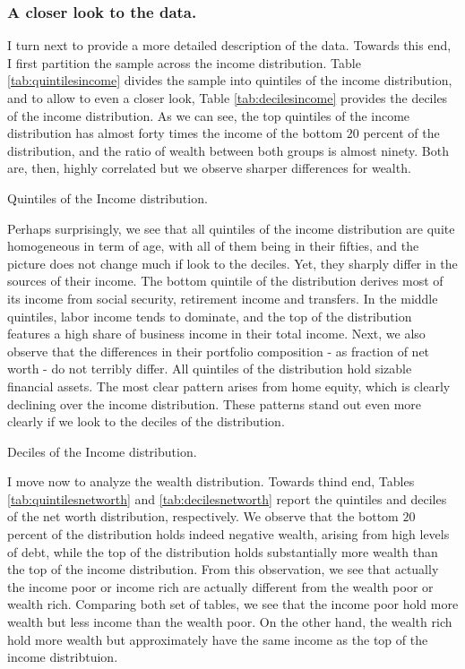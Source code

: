 \documentclass[11pt, a4paper, leqno]{article}
\begin{document}
\subsubsection*{A closer look to the data.}

I turn next to provide a more detailed description of the data. Towards this end, I first partition the sample across the income distribution. Table \ref*{tab:quintilesincome} divides the sample into quintiles of the income distribution, and to allow to even a closer look, Table \ref*{tab:decilesincome} provides the deciles of the income distribution. As we can see, the top quintiles of the income distribution has almost forty times the income of the bottom $20$ percent of the distribution, and the ratio of wealth between both groups is almost ninety. Both are, then, highly correlated but we observe sharper differences for wealth.

\begin{table}[h]
    \caption{Quintiles of the Income distribution.}
    \resizebox{\textwidth}{!}{}
    \label{tab:quintilesincome}
\end{table}

Perhaps surprisingly, we see that all quintiles of the income distribution are quite homogeneous in term of age, with all of them being in their fifties, and the picture does not change much if look to the deciles. Yet, they sharply differ in the sources of their income. The bottom quintile of the distribution derives most of its income from social security, retirement income and transfers. In the middle quintiles, labor income tends to dominate, and the top of the distribution features a high share of business income in their total income. Next, we also observe that the differences in their portfolio composition - as fraction of net worth - do not terribly differ. All quintiles of the distribution hold sizable financial assets. The most clear pattern arises from home equity, which is clearly declining over the income distribution. These patterns stand out even more clearly if we look to the deciles of the distribution. 

\begin{table}[h]
    \caption{Deciles of the Income distribution.}
    \resizebox{\textwidth}{!}{}
    \label{tab:decilesincome}
\end{table}

I move now to analyze the wealth distribution. Towards thind end, Tables \ref*{tab:quintilesnetworth} and \ref*{tab:decilesnetworth} report the quintiles and deciles of the net worth distribution, respectively. We observe that the bottom $20$ percent of the distribution holds indeed negative wealth, arising from high levels of debt, while the top of the distribution holds substantially more wealth than the top of the income distribution. From this observation, we see that actually the income poor or income rich are actually different from the wealth poor or wealth rich. Comparing both set of tables, we see that the income poor hold more wealth but less income than the wealth poor. On the other hand, the wealth rich hold more wealth but approximately have the same income as the top of the income distribtuion.
\end{document}
